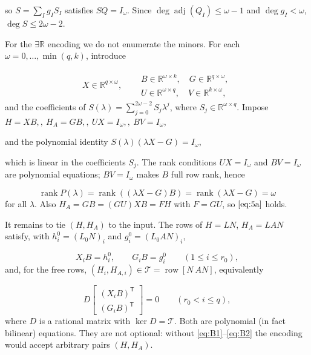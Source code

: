 \documentclass[journal]{IEEEtran}
\theoremstyle{plainn}
\theoremstyle{remark}
\begin{document}
so $S=\sum_I g_I S_I$ satisfies $SQ=I_\omega$. Since $\deg\operatorname{adj}(Q_I)\le\omega-1$ and $\deg g_I<\omega$, $\deg S\le2\omega-2$.

For the $\exists\mathbb R$ encoding we do not enumerate the minors. For each $\omega=0,\dots,\min(q,k)$, introduce

\begin{equation}
\begin{gathered}
X\in\mathbb R^{q\times\omega},\quad
\begin{aligned}
&B\in\mathbb R^{\omega\times k},\quad G\in\mathbb R^{q\times\omega},\\
&U\in\mathbb R^{\omega\times q},\quad V\in\mathbb R^{k\times\omega},
\end{aligned}
\end{gathered}
\end{equation}
and the coefficients of $S(\lambda)=\sum_{j=0}^{2\omega-2}S_j\lambda^j$, where $S_j\in\mathbb R^{\omega\times q}$. Impose $H=XB,,\  H_A=GB,,\  UX=I_\omega,,\  BV=I_\omega$,

and the polynomial identity $S(\lambda)(\lambda X-G)=I_\omega$,

which is linear in the coefficients $S_j$. The rank conditions $UX=I_\omega$ and $BV=I_\omega$ are polynomial equations; $BV=I_\omega$ makes $B$ full row rank, hence

\begin{equation}
\operatorname{rank}P(\lambda)=\operatorname{rank}((\lambda X-G)B)
=\operatorname{rank}(\lambda X-G)=\omega
\end{equation}
for all $\lambda$. Also $H_A=GB=(GU)XB=FH$ with $F=GU$, so $\eqref{eq:5a}$ holds.

It remains to tie $(H,H_A)$ to the input. The rows of $H=LN$, $H_A=LAN$ satisfy, with $h_i^0=(L_0N)_i$ and $g_i^0=(L_0AN)_i$,

\begin{equation}
X_iB=h_i^0,\qquad G_iB=g_i^0\qquad(1\le i\le r_0),
\tag{B.1}\label{eq:B1}
\end{equation}
and, for the free rows, $(H_i,H_{A,i})\in\mathcal T=\operatorname{row}[N\ AN]$, equivalently

\begin{equation}
D\begin{bmatrix}(X_iB)^{\mathsf T}\\ (G_iB)^{\mathsf T}\end{bmatrix}=0
\qquad(r_0<i\le q),
\tag{B.2}\label{eq:B2}
\end{equation}
where $D$ is a rational matrix with $\ker D=\mathcal T$. Both are polynomial (in fact bilinear) equations. They are not optional: without \eqref{eq:B1}--\eqref{eq:B2} the encoding would accept arbitrary pairs $(H,H_A)$.
\end{document}
